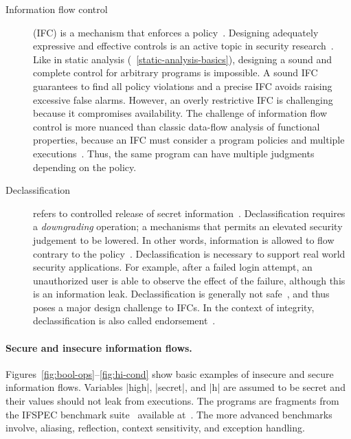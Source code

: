 \begin{description}
\item[Information flow control] (IFC)
is a mechanism that enforces a {policy}~\cite{bishop2003}.
Designing adequately expressive and effective controls is an active topic in security research~\cite{vandermeyden2007,bossi2005,sabelfeld2003}.
Like in static analysis (\cf~\autoref{static-analysis-basics}), designing a sound and complete control for arbitrary programs is impossible.
A sound IFC guarantees to find all policy violations and a precise IFC avoids raising excessive false alarms.
However, an overly restrictive IFC is challenging because it compromises availability.
The challenge of information flow control is more nuanced than classic data-flow analysis of functional properties,
because an IFC must consider a program \wrt policies and multiple executions~\cite{frumin2021}.
Thus, the same program can have multiple judgments depending on the policy.

\item[Declassification]
refers to controlled release of secret information~\cite{sabelfeld2009}.
Declassification requires a \emph{downgrading} operation;
a mechanisms that permits an elevated security judgement to be lowered.
In other words, information is allowed to flow contrary to the {policy}~\cite{cecchetti2017}.
Declassification is necessary to support real world security applications.
For example, after a failed login attempt, an unauthorized user is able to observe the effect of the failure, 
although this is an information leak.
Declassification is generally not safe~\cite{derakhshan2024}, 
and thus poses a major design challenge to IFCs.
In the context of integrity, declassification is also called {endorsement}~\cite{marion2011}.

\end{description}

\paragraph*{Secure and insecure information flows.}
Figures~\ref{fig:bool-ops}--\ref{fig:hi-cond} show basic examples of insecure and secure information flows.
Variables \pr|high|, \pr|secret|, and \pr|h| are assumed to be secret and their values should not leak from executions.
The programs are fragments from the {IFSPEC benchmark suite}~\cite{hamann2018} available at~\cite{ifspec}.
The more advanced benchmarks involve, \eg aliasing, reflection, context sensitivity, and exception handling.

